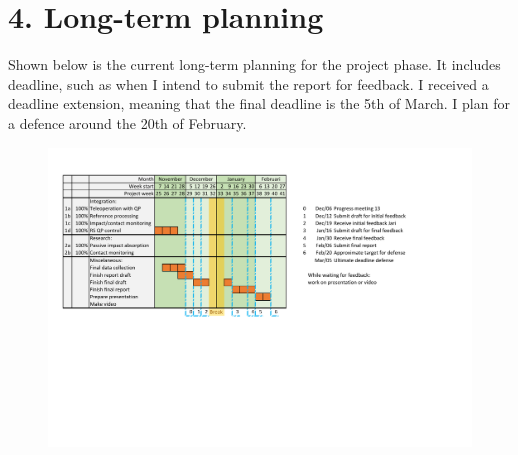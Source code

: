 \documentclass[11pt]{report}
\numberwithin{equation}{section}        %
\numberwithin{figure}{section}          %
\numberwithin{table}{section}           %
\begin{document}
  \section*{4. Long-term planning}
  Shown below is the current long-term planning for the project phase. It includes deadline, such as when I intend to submit the report for feedback. I received a deadline extension, meaning that the final deadline is the 5th of March. I plan for a defence around the 20th of February.

  \begin{figure}[H]
  \centering
  \includegraphics[width=\textwidth, trim={0.87cm 6.5cm 4.5cm 1.5cm},clip]{Graphics/planning v2.pdf}

  \label{fig:my_label}
  \end{figure}
\end{document}
